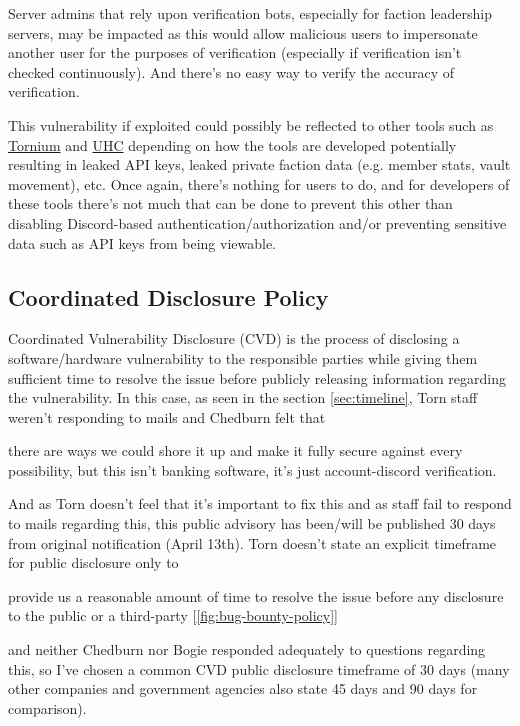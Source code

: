 \documentclass{article}
\begin{document}
{\par{Server admins that rely upon verification bots, especially for faction leadership servers, may be impacted as this would allow malicious users to impersonate another user for the purposes of verification (especially if verification isn't checked continuously). And there's no easy way to verify the accuracy of verification.}

\par{This vulnerability if exploited could possibly be reflected to other tools such as \href{https://tornium.com}{Tornium} and \href{https://tornuhc.eu}{UHC} depending on how the tools are developed potentially resulting in leaked API keys, leaked private faction data (e.g. member stats, vault movement), etc. Once again, there's nothing for users to do, and for developers of these tools there's not much that can be done to prevent this other than disabling Discord-based authentication/authorization and/or preventing sensitive data such as API keys from being viewable.}

\subsection{Coordinated Disclosure Policy}
\par{Coordinated Vulnerability Disclosure (CVD) is the process of disclosing a software/hardware vulnerability to the responsible parties while giving them sufficient time to resolve the issue before publicly releasing information regarding the vulnerability. In this case, as seen in the section \ref{sec:timeline}, Torn staff weren't responding to mails and Chedburn felt that 
\begin{displayquote}
	there are ways we could shore it up and make it fully secure against every possibility, but this isn’t banking software, it’s just account-discord verification.
\end{displayquote}
And as Torn doesn't feel that it's important to fix this and as staff fail to respond to mails regarding this, this public advisory has been/will be published 30 days from original notification (April 13th). Torn doesn't state an explicit timeframe for public disclosure only to
\begin{displayquote}
	provide us a reasonable amount of time to resolve the issue before any disclosure to the public or a third-party [\ref{fig:bug-bounty-policy}]
\end{displayquote}
and neither Chedburn nor Bogie responded adequately to questions regarding this, so I've chosen a common CVD public disclosure timeframe of 30 days (many other companies and government agencies also state 45 days and 90 days for comparison).}

}
\end{document}
